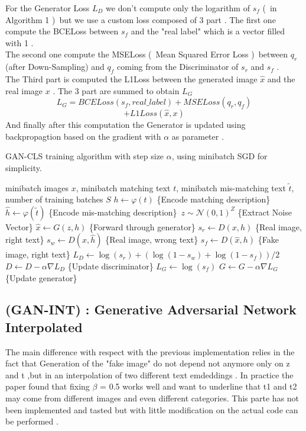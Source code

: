 For the Generator Loss $L_D$ we don't compute only the logarithm
of ${s_f}$ (\ in Algorithm 1 )\ but we use a custom loss composed of 3 part .
The first one compute the BCELoss between ${s_f}$ and the "real label" which is
a vector filled with 1 . \\
The second one compute the MSELoss (\ Mean Squared Error Loss )\ between 
${q_r}$ (after Down-Sampling) and ${q_f}$ coming from the Discriminator of
${s_r}$ and ${s_f}$ . \\
The Third part is computed the L1Loss between the generated image $\hat{x}$
and the real image ${x}$ .
The 3 part are summed to obtain $L_G$
\[
 L_G = BCELoss( s_f,real\_label ) + MSELoss( q_r , q_f ) 
\]
\[
 + L1Loss(\hat{x},x)
\]
And finally after this computation the Generator is updated using backpropagtion 
based on the gradient with $\alpha$ as parameter .



\begin{algorithm}
    \caption{GAN-CLS training algorithm with step size $\alpha$, using minibatch SGD for simplicity.}
    \begin{algorithmic}
        \Require minibatch images $x$, minibatch matching text $t$, minibatch mis-matching text $\tilde{t}$, 
        number of training batches $S$
            \State $h \leftarrow \varphi(t)$ \hfill \{Encode matching description\}
            \State $\hat{h} \leftarrow \varphi(\tilde{t})$ \hfill \{Encode mis-matching description\}\
            \State $z \sim \mathcal{N}(0, 1)^Z$ \hfill \{Extract Noise Vector\}
            \State $\hat{x} \leftarrow G(z, h)$ \hfill \{Forward through generator\}
            \State $s_r \leftarrow D(x, h)$ \hfill \{Real image, right text\}
            \State $s_w \leftarrow D(x, \hat{h})$ \hfill \{Real image, wrong text\}
            \State $s_f \leftarrow D(\hat{x}, h)$ \hfill \{Fake image, right text\}
            \State $L_D \leftarrow \log(s_r) + \left(\log(1 - s_w) + \log(1 - s_f)\right) / 2$
            \State $D \leftarrow D - \alpha \nabla L_D$ \hfill \{Update discriminator\}
            \State $L_G \leftarrow \log(s_f)$
            \State $G \leftarrow G - \alpha \nabla L_G$ \hfill \{Update generator\}
        \EndFor
    \end{algorithmic}
\end{algorithm}


\subsection*{(GAN-INT) :  Generative Adversarial Network Interpolated}
The main difference with respect with the previous implementation relies 
in the fact that Generation of the "fake image" do not depend not anymore 
only on z and t ,but in an interpolation of two different text emdeddings .
In practice the paper found that fixing ${\beta}$ = 0.5 works well and want to
underline that t1 and t2 may come from different images and 
even different categories.
This parte has not been implemented and tasted but with little modification
on the actual code can be performed . 


